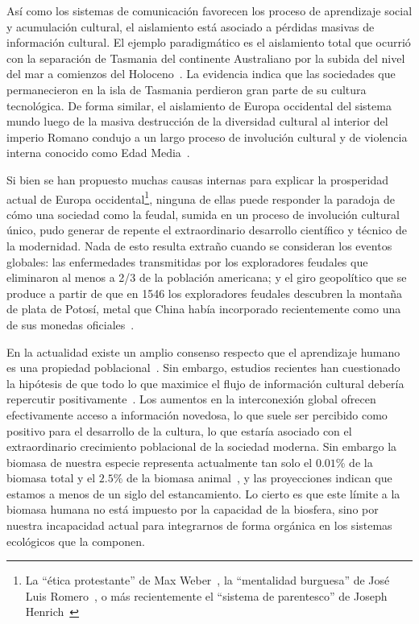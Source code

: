 \documentclass[a4paper,11pt]{book}
\theoremstyle{definition}
\begin{document}

As\'i como los sistemas de comunicaci\'on favorecen los proceso de aprendizaje social y acumulaci\'on cultural, el aislamiento est\'a asociado a p\'erdidas masivas de informaci\'on cultural.
%
El ejemplo paradigm\'atico es el aislamiento total que ocurri\'o con la separaci\'on de Tasmania del continente Australiano por la subida del nivel del mar a comienzos del Holoceno~\cite{Henrich2004}.
%
La evidencia indica que las sociedades que permanecieron en la isla de Tasmania perdieron gran parte de su cultura tecnol\'ogica.
%
De forma similar, el aislamiento de Europa occidental del sistema mundo luego de la masiva destrucci\'on de la diversidad cultural al interior del imperio Romano condujo a un largo proceso de involuci\'on cultural y de violencia interna conocido como Edad Media~\cite{dussel2004}.

%

Si bien se han propuesto muchas causas internas para explicar la prosperidad actual de Europa occidental\footnote{La ``\'etica protestante'' de Max Weber~\cite{weber1905-eticaProtestante}, la ``mentalidad burguesa'' de Jos\'e Luis Romero~\cite{romero1967-revolucionBurguesa}, o m\'as recientemente el ``sistema de parentesco'' de Joseph Henrich~\cite{henrich2020-weirdest}}, ninguna de ellas puede responder la paradoja de c\'omo una sociedad como la feudal, sumida en un proceso de involuci\'on cultural \'unico, pudo generar de repente el extraordinario desarrollo cient\'ifico y t\'ecnico de la modernidad.
%
Nada de esto resulta extra\~no cuando se consideran los eventos globales: las enfermedades transmitidas por los exploradores feudales que eliminaron al menos a 2/3 de la poblaci\'on americana; y el giro geopol\'itico que se produce a partir de que en 1546 los exploradores feudales descubren la monta\~na de plata de Potos\'i, metal que China hab\'ia incorporado recientemente como una de sus monedas oficiales~\cite{dussel2017}.


En la actualidad existe un amplio consenso respecto que el aprendizaje humano es una propiedad poblacional~\cite{Derex2020}.
%
Sin embargo, estudios recientes han cuestionado la hip\'otesis de que todo lo que maximice el flujo de informaci\'on cultural deber\'ia repercutir positivamente~\cite{Derex2020}.
%
Los aumentos en la interconexi\'on global ofrecen efectivamente acceso a informaci\'on novedosa, lo que suele ser percibido como positivo para el desarrollo de la cultura, lo que estar\'ia asociado con el extraordinario crecimiento poblacional de la sociedad moderna.
%
Sin embargo la biomasa de nuestra especie representa actualmente tan solo el $0.01$\% de la biomasa total y el $2.5$\% de la biomasa animal~\cite{barOn2018-biomass}, y las proyecciones indican que estamos a menos de un siglo del estancamiento.
%
Lo cierto es que este l\'imite a la biomasa humana no est\'a impuesto por la capacidad de la biosfera, sino por nuestra incapacidad actual para integrarnos de forma org\'anica en los sistemas ecol\'ogicos que la componen.
\end{document}
